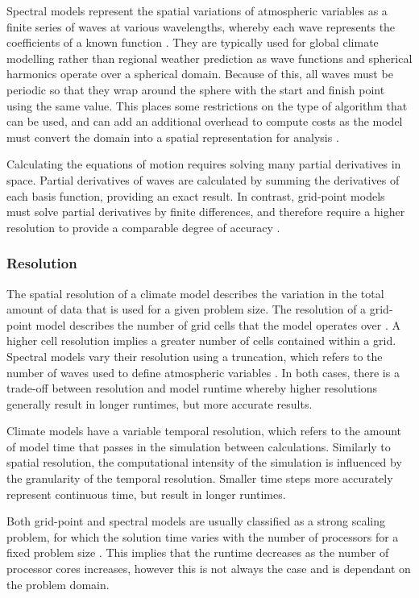 \documentclass[a4paper,11pt]{report}
\begin{document}
\par
Spectral models represent the spatial variations of atmospheric variables as a finite series of waves at various wavelengths, whereby each wave represents the coefficients of a known function \cite{bourke1988spectral}. They are typically used for global climate modelling rather than regional weather prediction as wave functions and spherical harmonics operate over a spherical domain. Because of this, all waves must be periodic so that they wrap around the sphere with the start and finish point using the same value. This places some restrictions on the type of algorithm that can be used, and can add an additional overhead to compute costs as the model must convert the domain into a spatial representation for analysis \cite{orszag1974fourier}. 
\par
Calculating the equations of motion requires solving many partial derivatives in space. Partial derivatives of waves are calculated by summing the derivatives of each basis function, providing an exact result. In contrast, grid-point models must solve partial derivatives by finite differences, and therefore require a higher resolution to provide a comparable degree of accuracy \cite{bart1998coordinate}. 

\subsubsection{Resolution} 
The spatial resolution of a climate model describes the variation in the total amount of data that is used for a given problem size. The resolution of a grid-point model describes the number of grid cells that the model operates over \cite{goosse2010introduction}. A higher cell resolution implies a greater number of cells contained within a grid. Spectral models vary their resolution using a truncation, which refers to the number of waves used to define atmospheric variables \cite{goosse2010introduction}. In both cases, there is a trade-off between resolution and model runtime whereby higher resolutions generally result in longer runtimes, but more accurate results. 
\par
Climate models have a variable temporal resolution, which refers to the amount of model time that passes in the simulation between calculations. Similarly to spatial resolution, the computational intensity of the simulation is influenced by the granularity of the temporal resolution. Smaller time steps more accurately represent continuous time, but result in longer runtimes.
\par
Both grid-point and spectral models are usually classified as a strong scaling problem, for which the solution time varies with the number of processors for a fixed problem size \cite{colella2007performance}. This implies that the runtime decreases as the number of processor cores increases, however this is not always the case and is dependant on the problem domain.
\end{document}
